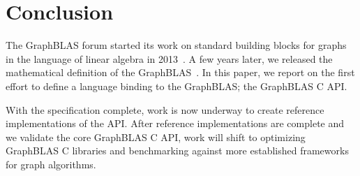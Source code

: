 \section{Conclusion}
\label{sec:conclusion}

The GraphBLAS forum started its work on standard building blocks for 
graphs in the language of linear algebra in 2013~\cite{hpec13}.  A few
years later, we released the mathematical
definition of the GraphBLAS~\cite{mathgraphblas16}.
In this paper, we report on the first effort to define a language binding
to the GraphBLAS; the GraphBLAS C API.

With the specification complete, work is now underway to create 
reference implementations of the API.  
After reference implementations are complete and we validate
the core GraphBLAS C API, work will shift to optimizing
GraphBLAS C libraries and benchmarking against more established
frameworks for graph algorithms. 